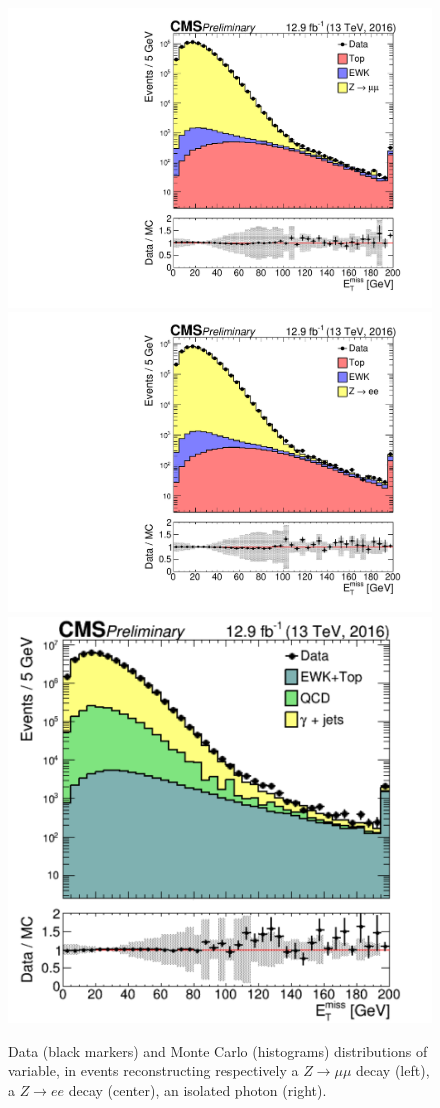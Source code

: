 \begin{figure}[!htb]
  \centering
    \includegraphics[width=.33\textwidth]{figures/MetPlots/distr_mu.pdf}%
    \includegraphics[width=.33\textwidth]{figures/MetPlots/distr_ele.pdf}%
    \includegraphics[width=.33\textwidth]{figures/MetPlots/distr_gamma.pdf}


  \caption{Data (black markers) and Monte Carlo (histograms) distributions of \MET variable, in events reconstructing respectively a $Z \rightarrow \mu \mu$ decay (left), a $Z \rightarrow e e$ decay (center), an isolated photon (right).~\cite{CMS:2016ljj}}
  \label{fig:recoil_distribution}
\end{figure}


